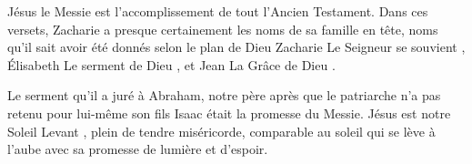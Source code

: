 Jésus le Messie est l'accomplissement de tout l'Ancien Testament. Dans ces versets, Zacharie a presque certainement les noms de sa famille en tête, noms qu'il sait avoir été donnés selon le plan de Dieu\frcolon{} Zacharie \ocadr \Og Le Seigneur se souvient \Fg{}, Élisabeth \ocadr \Og Le serment de Dieu \Fg{}, et Jean \ocadr \Og La Grâce de Dieu \Fg{}.

\Og Le serment qu’il a juré à Abraham, notre père \Fg{} après que le patriarche n'a pas retenu pour lui-même son fils Isaac était la promesse du Messie. Jésus est notre \Og Soleil Levant \Fg{}, plein de tendre miséricorde, comparable au soleil qui se lève à l'aube avec sa promesse de lumière et d'espoir.


\begin{dvquotes}
\end{dvquotes}
